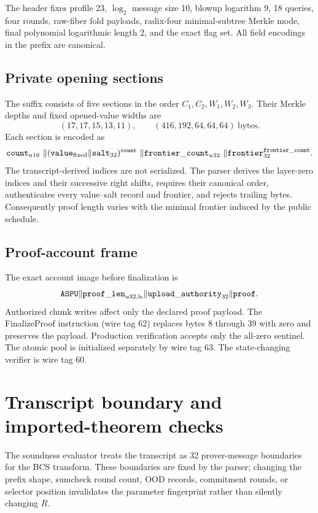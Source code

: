 The header fixes profile 23, \(\log_2\) message size 10, blowup logarithm 9,
18 queries, four rounds, raw-fiber fold payloads, radix-four minimal-subtree
Merkle mode, final polynomial logarithmic length 2, and the exact flag set.
All field encodings in the prefix are canonical.

\subsection{Private opening sections}

The suffix consists of five sections in the order \(C_1,C_2,W_1,W_2,W_3\).
Their Merkle depths and fixed opened-value widths are
\[
 (17,17,15,13,11),\qquad
 (416,192,64,64,64)\ \text{bytes}.
\]
Each section is encoded as
\[
 \mathtt{count}_{u16}\ \|
 (\mathtt{value}_{\rm fixed}\|\mathtt{salt}_{32})^{\mathtt{count}}\ \|
 \mathtt{frontier\_count}_{u32}\ \|
 \mathtt{frontier}_{32}^{\mathtt{frontier\_count}}.
\]
The transcript-derived indices are not serialized.  The parser derives the
layer-zero indices and their successive right shifts, requires their
canonical order, authenticates every value--salt record and frontier, and
rejects trailing bytes.  Consequently proof length varies with the minimal
frontier induced by the public schedule.

\subsection{Proof-account frame}

The exact account image before finalization is
\[
 \mathtt{ASPU}\|\mathtt{proof\_len}_{u32,\rm le}
 \|\mathtt{upload\_authority}_{32}\|\mathtt{proof}.
\]
Authorized chunk writes affect only the declared proof payload.  The
\textsf{FinalizeProof} instruction (wire tag 62) replaces bytes 8 through 39
with zero and preserves the payload.  Production verification accepts only
the all-zero sentinel.  The atomic pool is initialized separately by wire tag
63.  The state-changing verifier is wire tag 60.

\section{Transcript boundary and imported-theorem checks}
\label{app:transcript-hypotheses}

The soundness evaluator treats the transcript as 32 prover-message
boundaries for the BCS transform.  These boundaries are fixed by the parser;
changing the prefix shape, sumcheck round count, OOD records, commitment
rounds, or selector position invalidates the parameter fingerprint rather
than silently changing \(R\).

